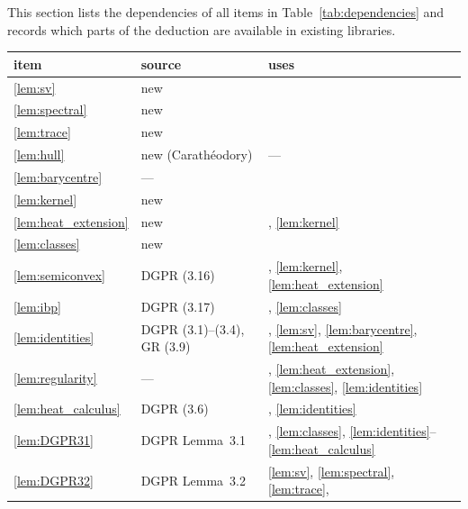 \documentclass[a4paper,twoside,leqno]{article}
\begin{document}
\begin{miniremark}
    \label{mr:sec_summary}
    This section lists the dependencies of all items in Table~\ref{tab:dependencies} and records
    which parts of the deduction are available in existing libraries.
\end{miniremark}

\begin{table}[ht]
    \centering
    \small
    \begin{tabular}{p{}p{}p{}}
        item & source & uses \\ \hline
        \ref{lem:sv} & new & \cite[1.7.3, 1.7.9]{Federer1969} \\
        \ref{lem:spectral} & new & \cite[1.7.3, 1.7.9]{Federer1969} \\
        \ref{lem:trace} & new & \cite[1.7.3, 1.7.10]{Federer1969} \\
        \ref{lem:hull} & new (Carath\'eodory) & --- \\
        \ref{lem:barycentre} & --- & \cite[2.4.12, 2.4.19]{Federer1969} \\
        \ref{lem:kernel} & new & \cite[2.6.2]{Federer1969} \\
        \ref{lem:heat_extension} & new & \cite[2.4.9, 2.4.12, 2.6.2]{Federer1969},
        \ref{lem:kernel} \\
        \ref{lem:classes} & new & \cite[2.4.9, 2.6.2, 3.1.11]{Federer1969} \\
        \ref{lem:semiconvex} & DGPR (3.16) & \cite[2.4.14]{Federer1969}, \ref{lem:kernel},
        \ref{lem:heat_extension} \\
        \ref{lem:ibp} & DGPR (3.17) & \cite[2.4.9, 2.9.9, 3.1.6, 4.1.2]{Federer1969},
        \ref{lem:classes} \\
        \ref{lem:identities} & DGPR (3.1)--(3.4), GR (3.9) & \cite[2.5.14, 4.1.5]{Federer1969},
        \ref{lem:sv}, \ref{lem:barycentre}, \ref{lem:heat_extension} \\
        \ref{lem:regularity} & --- & \cite[3.1.11]{Federer1969}, \ref{lem:heat_extension},
        \ref{lem:classes}, \ref{lem:identities} \\
        \ref{lem:heat_calculus} & DGPR (3.6) & \cite[3.1.11]{Federer1969}, \ref{lem:identities}
        \\
        \ref{lem:DGPR31} & DGPR Lemma~3.1 & \cite[2.4.7, 2.4.19]{Federer1969},
        \ref{lem:classes}, \ref{lem:identities}--\ref{lem:heat_calculus} \\
        \ref{lem:DGPR32} & DGPR Lemma~3.2 & \ref{lem:sv}, \ref{lem:spectral}, \ref{lem:trace},

\end{tabular}
\end{table}
\end{document}
